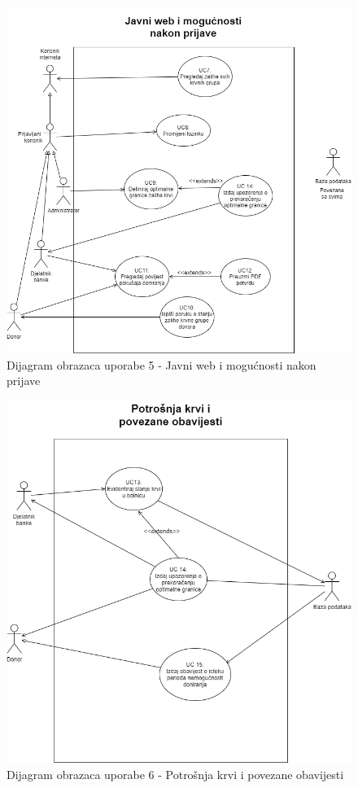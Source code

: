 				\begin{figure}[H]
    			\includegraphics[scale=0.6]{slike/UC5.png} %
    			\centering
    			\caption{Dijagram obrazaca uporabe 5 - Javni web i mogućnosti nakon prijave}
    			\label{fig:promjene}
    	    	\end{figure}
    	    	
				\begin{figure}[H]
    			\includegraphics[scale=0.6]{slike/UC6.png} %
    			\centering
    			\caption{Dijagram obrazaca uporabe 6 - Potrošnja krvi i povezane obavijesti}
    			\label{fig:promjene}
    	    	\end{figure}
    	    	
